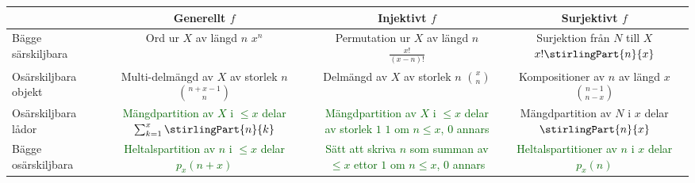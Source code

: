 \documentclass[nobib]{tufte-handout}
\begin{document}
\begin{fullwidth}
  \begin{tabularx}{\linewidth}{l|ccc}
      & Generellt $f$ & Injektivt $f$ & Surjektivt $f$\\
      \midrule
    Bägge särskiljbara & \specialcell{Ord ur $X$ av längd $n$\\ $x^n$} & \specialcell{Permutation ur $X$ av längd $n$\\ $\frac{x!}{(x-n)!}$} & \specialcell{Surjektion från $N$ till $X$\\$x!\stirlingPart{n}{x}$} \\
    Osärskiljbara objekt & \specialcell{Multi-delmängd av $X$\\ av storlek $n$\\$\binom{n + x - 1}{n}$} & \specialcell{Delmängd av $X$ av storlek $n$\\$\binom{x}{n}$} & \specialcell{Kompositioner av $n$\\av längd $x$\\$\binom{n - 1}{n - x}$} \\
    Osärskiljbara lådor & \specialcell{\textcolor{darkgreen}{Mängdpartition av $X$}\\ \textcolor{darkgreen}{ i $\leq x$ delar} \\\textcolor{darkgreen}{$\sum_{k=1}^{x} \stirlingPart{n}{k}$}} & \specialcell{\textcolor{darkgreen}{Mängdpartition av $X$}\\ \textcolor{darkgreen}{i $\leq x$ delar av storlek $1$}\\\textcolor{darkgreen}{$1$ om $n \leq x$, $0$ annars}} & \specialcell{Mängdpartition av $N$\\i $x$ delar\\$\stirlingPart{n}{x}$} \\
    Bägge osärskiljbara & \specialcell{\textcolor{darkgreen}{Heltalspartition av $n$ i $\leq x$ delar}\\\textcolor{darkgreen}{$p_x(n + x)$}} & \specialcell{\textcolor{darkgreen}{Sätt att skriva $n$ som}\\\textcolor{darkgreen}{summan av $\leq x$ ettor}\\\textcolor{darkgreen}{$1$ om $n \leq x$, $0$ annars}} & \specialcell{\textcolor{darkgreen}{Heltalspartitioner av $n$}\\ \textcolor{darkgreen}{i $x$ delar} \\\textcolor{darkgreen}{$p_x(n)$}} 
  \end{tabularx}
\end{fullwidth}
\end{document}

